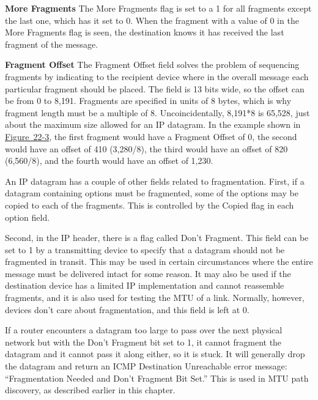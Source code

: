 {\textbf{\protect\hypertarget{ch22s02.htmlux5cux23idx-CHP-22-0811}{}{}More
Fragments}} The More Fragments flag is set to a 1 for all fragments
except the last one, which has it set to 0. When the fragment with a
value of 0 in the More Fragments flag is seen, the destination knows it
has received the last fragment of the message.

{\textbf{Fragment Offset}} The Fragment Offset field solves the problem
of sequencing fragments by indicating to the recipient device where in
the overall message each particular fragment should be placed. The field
is 13 bits wide, so the offset can be from 0 to 8,191. Fragments are
specified in units of 8 bytes, which is why fragment length must be a
multiple of 8. Uncoincidentally, 8,191*8 is 65,528, just about the
maximum size allowed for an IP datagram. In the example shown in
\protect\hyperlink{ch22s02.htmlux5cux23ipv4_datagram_fragmentation_process_in_t}{Figure~22-3},
the first fragment would have a Fragment Offset of 0, the second would
have an offset of 410 (3,280/8), the third would have an offset of 820
(6,560/8), and the fourth would have an offset of 1,230.

An IP datagram has a couple of other fields related to fragmentation.
First, if a datagram containing options must be fragmented, some of the
options may be copied to each of the fragments. This is controlled by
the \protect\hypertarget{ch22s02.htmlux5cux23idx-CHP-22-0812}{}{}Copied
flag in each option field.

Second, in the IP header, there is a flag called
\protect\hypertarget{ch22s02.htmlux5cux23idx-CHP-22-0813}{}{}Don't
Fragment. This field can be set to 1 by a transmitting device to specify
that a datagram should not be fragmented in transit. This may be used in
certain circumstances where the entire message must be delivered intact
for some reason. It may also be used if the destination device has a
limited IP implementation and cannot reassemble fragments, and it is
also used for testing the MTU of a link. Normally, however, devices
don't care about fragmentation, and this field is left at 0.

If a router encounters a datagram too large to pass over the next
physical network but with the Don't Fragment bit set to 1, it cannot
fragment the datagram and it cannot pass it along either, so it is
stuck. It will generally drop the datagram and return an ICMP
Destination Unreachable error message: ``Fragmentation Needed and Don't
Fragment Bit Set.'' This is used in MTU path discovery, as described
earlier in this chapter.


